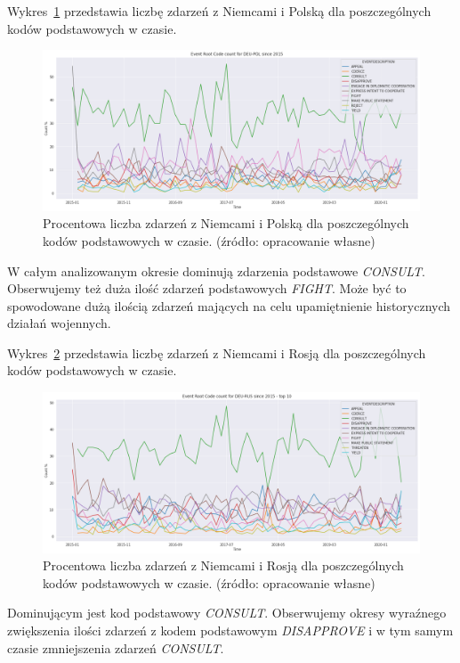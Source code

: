 \documentclass[11pt]{report}
\begin{document}
    Wykres~\ref{fig:DEUPOLERC} przedstawia liczbę zdarzeń z Niemcami i Polską dla poszczególnych kodów podstawowych w czasie.
    \begin{figure}[!htp]
        \centering
        \includegraphics[width=\linewidth]{fig/DEU/DEUPOLERCperc.png}
        \caption{Procentowa liczba zdarzeń z Niemcami i Polską dla poszczególnych kodów podstawowych w czasie. (źródło: opracowanie własne)}
        \label{fig:DEUPOLERC}
    \end{figure}
    W całym analizowanym okresie dominują zdarzenia podstawowe \textit{CONSULT}.
    Obserwujemy też duża ilość zdarzeń podstawowych \textit{FIGHT}.
    Może być to spowodowane dużą ilością zdarzeń mających na celu upamiętnienie historycznych działań wojennych.

    Wykres~\ref{fig:DEURUSERC} przedstawia liczbę zdarzeń z Niemcami i Rosją dla poszczególnych kodów podstawowych w czasie.
    \begin{figure}[!htp]
        \centering
        \includegraphics[width=\linewidth]{fig/DEU/DEURUSERCperc.png}
        \caption{Procentowa liczba zdarzeń z Niemcami i Rosją dla poszczególnych kodów podstawowych w czasie. (źródło: opracowanie własne)}
        \label{fig:DEURUSERC}
    \end{figure}
    Dominującym jest kod podstawowy \textit{CONSULT}.
    Obserwujemy okresy wyraźnego zwiększenia ilości zdarzeń z kodem podstawowym \textit{DISAPPROVE} i w tym samym czasie zmniejszenia zdarzeń \textit{CONSULT}.
\end{document}
